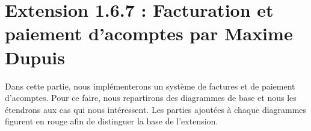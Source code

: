 \section{Extension 1.6.7 : Facturation et paiement d'acomptes par Maxime Dupuis}
\begin{flushleft}
Dans cette partie, nous implémenterons un système de factures et de paiement d'acomptes. Pour ce faire, nous repartirons des diagrammes de base et nous les étendrons aux cas qui nous intéressent. Les parties ajoutées à chaque diagrammes figurent en rouge afin de distinguer la base de l'extension.
\end{flushleft}
